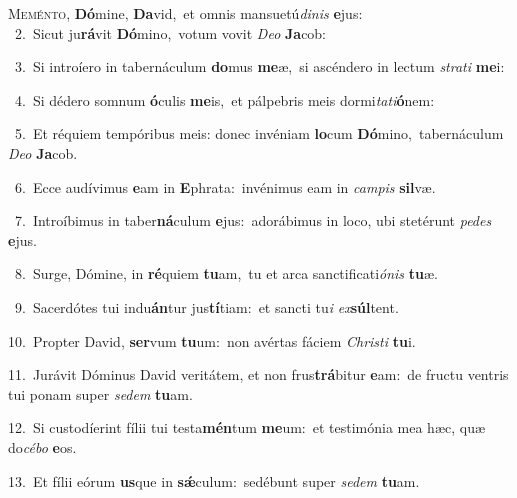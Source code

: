\lettrine{\initial\textcolor{\initialcolor}{M}}{eménto,} \textbf{Dó}\-mine, \textbf{Da}\-vid,~\star et omnis mansuetú\-\textit{di}\-\textit{nis} \textbf{e}\-jus:\\
{\numbfont\textcolor{\numbcolor}{~2.}}~Sicut ju\-\textbf{rá}\-vit \textbf{Dó}\-mino,~\star votum vovit \textit{De}\-\textit{o} \textbf{Ja}\-cob:\par
{\numbfont\textcolor{\numbcolor}{~3.}}~Si introíero in tabernáculum \textbf{do}\-mus \textbf{me}\-æ,~\star si ascéndero in lectum \textit{stra}\-\textit{ti} \textbf{me}\-i:\par
{\numbfont\textcolor{\numbcolor}{~4.}}~Si dédero somnum \textbf{ó}\-culis \textbf{me}\-is,~\star et pálpebris meis dormi\-\textit{ta}\-\textit{ti}\textbf{ó}nem:\par
{\numbfont\textcolor{\numbcolor}{~5.}}~Et réquiem tempóribus meis: donec invéniam \textbf{lo}\-cum \textbf{Dó}\-mino,~\star tabernáculum \textit{De}\-\textit{o} \textbf{Ja}\-cob.\par
{\numbfont\textcolor{\numbcolor}{~6.}}~Ecce audívimus \textbf{e}\-am in \textbf{E}\-phrata:~\star invénimus eam in \textit{cam}\-\textit{pis} \textbf{sil}\-væ.\par
{\numbfont\textcolor{\numbcolor}{~7.}}~Introíbimus in taber\-\textbf{ná}\-culum \textbf{e}\-jus:~\star adorábimus in loco, ubi stetérunt \textit{pe}\-\textit{des} \textbf{e}\-jus.\par
{\numbfont\textcolor{\numbcolor}{~8.}}~Surge, Dómine, in \textbf{ré}\-quiem \textbf{tu}\-am,~\star tu et arca sanctificati\-\textit{ó}\-\textit{nis} \textbf{tu}\-æ.\par
{\numbfont\textcolor{\numbcolor}{~9.}}~Sacerdótes tui indu\-\textbf{án}\-tur jus\-\textbf{tí}\-tiam:~\star et sancti tu\textit{i} \textit{ex}\-\textbf{súl}tent.\par
{\numbfont\textcolor{\numbcolor}{10.}}~Propter David, \textbf{ser}\-vum \textbf{tu}\-um:~\star non avértas fáciem \textit{Chris}\-\textit{ti} \textbf{tu}\-i.\par
{\numbfont\textcolor{\numbcolor}{11.}}~Jurávit Dóminus David veritátem, et non frus\-\textbf{trá}\-bitur \textbf{e}\-am:~\star de fructu ventris tui ponam super \textit{se}\-\textit{dem} \textbf{tu}\-am.\par
{\numbfont\textcolor{\numbcolor}{12.}}~Si custodíerint fílii tui testa\-\textbf{mén}\-tum \textbf{me}\-um:~\star et testimónia mea hæc, quæ do\-\textit{cé}\-\textit{bo} \textbf{e}\-os.\par
{\numbfont\textcolor{\numbcolor}{13.}}~Et fílii eórum \textbf{us}\-que in \textbf{sǽ}\-culum:~\star sedébunt super \textit{se}\-\textit{dem} \textbf{tu}\-am.\par
